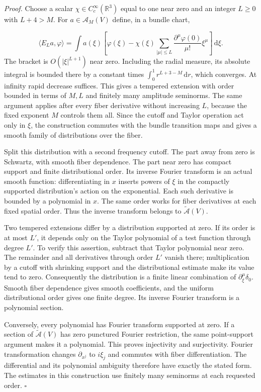 \documentclass[
  english,
  11pt,
  reqno]{amsart}
\begin{document}
\emph{Proof.} Choose a scalar \(\chi\in C_c^\infty(\mathbb R^3)\) equal
to one near zero and an integer \(L\ge0\) with \(L+4>M\). For
\(a\in\mathscr A_M(V)\) define, in a bundle chart,

\label{eq:online-root-finite-part-extension} \[
\langle E_La,\varphi\rangle
=\int a(\xi)\left[
\varphi(\xi)-\chi(\xi)
\sum_{|\mu|\le L}\frac{\partial^\mu\varphi(0)}{\mu!}\xi^\mu
\right]\,\mathrm d\xi.
\] The bracket is \(O(|\xi|^{L+1})\) near zero. Including the radial
measure, its absolute integral is bounded there by a constant times
\(\int_0^1r^{L+3-M}\,\mathrm dr\), which converges. At infinity rapid
decrease suffices. This gives a tempered extension with order bounded in
terms of \(M,L\) and finitely many amplitude seminorms. The same
argument applies after every fiber derivative without increasing \(L\),
because the fixed exponent \(M\) controls them all. Since the cutoff and
Taylor operation act only in \(\xi\), the construction commutes with the
bundle transition maps and gives a smooth family of distributions over
the fiber.

Split this distribution with a second frequency cutoff. The part away
from zero is Schwartz, with smooth fiber dependence. The part near zero
has compact support and finite distributional order. Its inverse Fourier
transform is an actual smooth function: differentiating in \(x\) inserts
powers of \(\xi\) in the compactly supported distribution's action on
the exponential. Each such derivative is bounded by a polynomial in
\(x\). The same order works for fiber derivatives at each fixed spatial
order. Thus the inverse transform belongs to
\(\widetilde{\mathscr A}(V)\).

Two tempered extensions differ by a distribution supported at zero. If
its order is at most \(L'\), it depends only on the Taylor polynomial of
a test function through degree \(L'\). To verify this assertion,
subtract that Taylor polynomial near zero. The remainder and all
derivatives through order \(L'\) vanish there; multiplication by a
cutoff with shrinking support and the distributional estimate make its
value tend to zero. Consequently the distribution is a finite linear
combination of \(\partial_\xi^\mu\delta_0\). Smooth fiber dependence
gives smooth coefficients, and the uniform distributional order gives
one finite degree. Its inverse Fourier transform is a polynomial
section.

Conversely, every polynomial has Fourier transform supported at zero. If
a section of \(\widetilde{\mathscr A}(V)\) has zero punctured Fourier
restriction, the same point-support argument makes it a polynomial. This
proves injectivity and surjectivity. Fourier transformation changes
\(\partial_{x^j}\) to \(i\xi_j\) and commutes with fiber
differentiation. The differential and its polynomial ambiguity therefore
have exactly the stated form. The estimates in this construction use
finitely many seminorms at each requested order. \hfill\(\square\)
\end{document}
